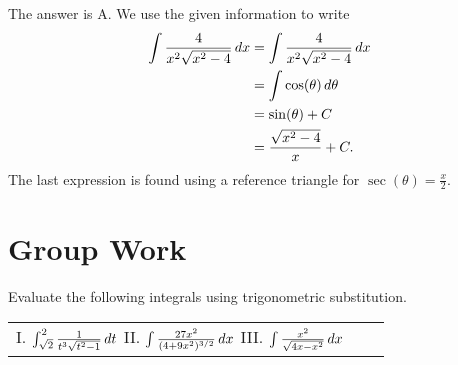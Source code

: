 \documentclass[noauthor]{ximera}
\begin{document}
\begin{freeResponse}
The answer is A. We use the given information to write
\begin{align*}
\displaystyle \int \dfrac{4}{x^2\sqrt{x^2-4}} \mathop{}\!d x &=  \int \dfrac{4}{x^2\sqrt{x^2-4}} \mathop{}\!d x \\
&=  \int \cos(\theta) \mathop{}\!d \theta \\
&=  \sin(\theta) + C \\
&=  \frac{\sqrt{x^2-4}}{x} + C.
\end{align*}
The last expression is found using a reference triangle for $\sec(\theta) = \frac{x}{2}$. 
\end{freeResponse}



\section{Group Work}



\begin{problem}
Evaluate the following integrals using trigonometric substitution.
\begin{center}
\begin{tabular}{lll}
I. $\int_{\sqrt{2}}^2 \frac{1}{t^3 \sqrt{t^2 -1}} \mathop{}\!d t$ \hspace{.2in} II. $\int \frac{27 x^2}{(4+9x^2)^{3/2}} \mathop{}\!d x$ \hspace{.2in} III. $\int \frac{x^2}{\sqrt{4x-x^2}} \mathop{}\!d x$
\end{tabular}
\end{center}
\end{problem}
\end{document}
